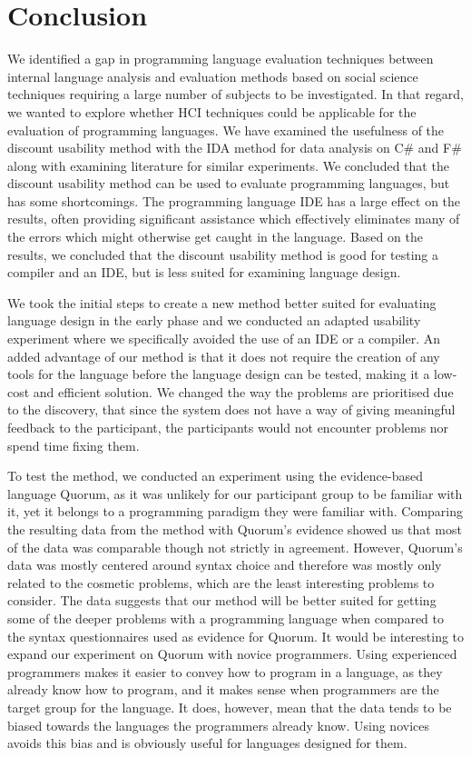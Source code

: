 \documentclass[preprint,10pt]{sigplanconf}
\begin{document}
\section{Conclusion}
We identified a gap in programming language evaluation techniques between internal language analysis and evaluation methods based on social science techniques requiring a large number of subjects to be investigated. In that regard, we wanted to explore whether HCI techniques could be applicable for the evaluation of programming languages.
We have examined the usefulness of the discount usability method with the IDA method for data analysis on C\# and F\# along with examining literature for similar experiments. We concluded that the discount usability method can be used to evaluate programming languages, but has some shortcomings.
The programming language IDE has a large effect on the results, often providing significant assistance which effectively eliminates many of the errors which might otherwise get caught in the language.
Based on the results, we concluded that the discount usability method is good for testing a compiler and an IDE, but is less suited for examining language design.

We took the initial steps to create a new method better suited for evaluating language design in the early phase and we conducted an adapted usability experiment where we specifically avoided the use of an IDE or a compiler.
An added advantage of our method is that it does not require the creation of any tools for the language before the language design can be tested, making it a low-cost and efficient solution.
We changed the way the problems are prioritised due to the discovery, that since the system does not have a way of giving meaningful feedback to the participant, the participants would not encounter problems nor spend time fixing them.

To test the method, we conducted an experiment using the evidence-based language Quorum, as it was unlikely for our participant group to be familiar with it, yet it belongs to a programming paradigm they were familiar with.
Comparing the resulting data from the method with Quorum’s evidence showed us that most of the data was comparable though not strictly in agreement.
However, Quorum’s data was mostly centered around syntax choice and therefore was mostly only related to the cosmetic problems, which are the least interesting problems to consider.
The data suggests that our method will be better suited for getting some of the deeper problems with a programming language when compared to the syntax questionnaires used as evidence for Quorum.
It would be interesting to expand our experiment on Quorum with novice programmers.
Using experienced programmers makes it easier to convey how to program in a language, as they already know how to program, and it  makes sense when programmers are the target group for the language.
It does, however, mean that the data tends to be biased towards the languages the programmers already know. Using novices avoids this bias and is obviously useful for languages designed for them.
\end{document}

